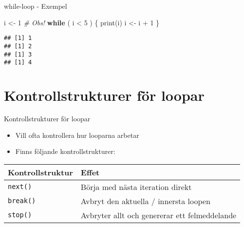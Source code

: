 \documentclass[
  11pt,
  ignorenonframetext,
]{beamer}
\newenvironment{Shaded}{\begin{snugshade}}{\end{snugshade}}
\newcommand{\CommentTok}[1]{\textcolor[rgb]{0.56,0.35,0.01}{\textit{#1}}}
\newcommand{\ControlFlowTok}[1]{\textcolor[rgb]{0.13,0.29,0.53}{\textbf{#1}}}
\newcommand{\DecValTok}[1]{\textcolor[rgb]{0.00,0.00,0.81}{#1}}
\newcommand{\FunctionTok}[1]{\textcolor[rgb]{0.00,0.00,0.00}{#1}}
\newcommand{\NormalTok}[1]{#1}
\newcommand{\OtherTok}[1]{\textcolor[rgb]{0.56,0.35,0.01}{#1}}
\newcommand{\SpecialCharTok}[1]{\textcolor[rgb]{0.00,0.00,0.00}{#1}}
\providecommand{\tightlist}{%
  \setlength{\itemsep}{0pt}\setlength{\parskip}{0pt}}
\begin{document}
\begin{frame}[fragile]{while-loop - Exempel}
\protect\hypertarget{while-loop---exempel}{}
\begin{Shaded}
\begin{Highlighting}[]
\NormalTok{i }\OtherTok{\textless{}{-}} \DecValTok{1} \CommentTok{\# Obs!}
\ControlFlowTok{while}\NormalTok{ ( i }\SpecialCharTok{\textless{}} \DecValTok{5}\NormalTok{ ) \{}
  \FunctionTok{print}\NormalTok{(i)}
\NormalTok{  i }\OtherTok{\textless{}{-}}\NormalTok{ i }\SpecialCharTok{+} \DecValTok{1}
\NormalTok{\}}
\end{Highlighting}
\end{Shaded}

\pause

\begin{verbatim}
## [1] 1
## [1] 2
## [1] 3
## [1] 4
\end{verbatim}
\end{frame}

\hypertarget{kontrollstrukturer-fuxf6r-loopar}{%
\section{Kontrollstrukturer för
loopar}\label{kontrollstrukturer-fuxf6r-loopar}}

\begin{frame}{Kontrollstrukturer för loopar}
\protect\hypertarget{kontrollstrukturer-fuxf6r-loopar-1}{}
\begin{itemize}
\tightlist
\item
  Vill ofta kontrollera hur looparna arbetar
\item
  Finns följande kontrollstrukturer:
\end{itemize}

\begin{longtable}[]{@{}ll@{}}
\toprule
\textbf{Kontrollstruktur} & \textbf{Effet} \\
\midrule
\endhead
\texttt{next()} & Börja med nästa iteration direkt \\
\texttt{break()} & Avbryt den aktuella / innersta loopen \\
\texttt{stop()} & Avbryter allt och genererar ett felmeddelande \\
\bottomrule
\end{longtable}
\end{frame}
\end{document}

